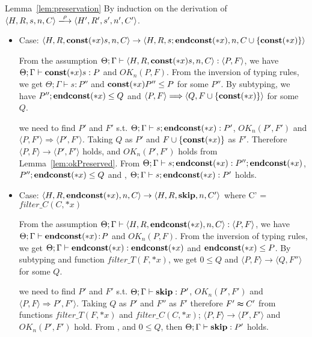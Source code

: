 \begin{pfof}{Lemma~\ref{lem:preservation}}
By induction on the derivation of \(\langle H, R, s, n, C \rangle
\xlongrightarrow{\rho} \langle H' ,R' ,s', n', C' \rangle\).

\begin{itemize}

\item Case: \( \langle H, R, \mathbf{const}(*x) s, n, C \rangle
  \rightarrow \langle H, R, s;\mathbf{endconst}(*x), n, C\cup
  \{\mathbf{const}(*x)\} \rangle \)

  From the assumption \( \Theta; \Gamma \vdash \langle H, R,
  \mathbf{const}(*x) s, n, C \rangle : \langle P, F \rangle\), we have \(
  \Theta; \Gamma \vdash \mathbf{const}(*x) s: P \) and \( OK_n(P, F) \). From
  the inversion of typing rules, we get \( \Theta; \Gamma \vdash s:P''
  \) and \( \mathbf{const}(*x) P'' \le P \) for some \( P'' \). By subtyping,
  we have \( P'';\mathbf{endconst}(*x) \le Q \) and \( \langle P, F \rangle
  \Longrightarrow \langle Q, F\cup \{\mathbf{const}(*x)\} \rangle \) for some
  \( Q \).

  we need to find \(P'\) and \(F'\) s.t. \( \Theta; \Gamma \vdash
  s;\mathbf{endconst}(*x):P'\), \( OK_n(P', F')\) and \( \langle P, F' \rangle
  \Longrightarrow \langle P', F' \rangle \). Taking \( Q \) as \( P'\)
  and \( F \cup \{\mathbf{const}(*x)\} \) as \(F'\). Therefore \( \langle P, F
  \rangle \rightarrow \langle P', F' \rangle\) holds, and \( OK_n(P',
  F')\) holds from Lemma~\ref{lem:okPreserved}. From \( \Theta; \Gamma
  \vdash s;\mathbf{endconst}(*x):P'';\mathbf{endconst}(*x) \), \( P'';\mathbf{endconst}(*x) \le Q \) and
  , \( \Theta; \Gamma \vdash s;\mathbf{endconst}(*x):P'\) holds.

\item Case: \( \langle H, R, \mathbf{endconst}(*x), n, C \rangle \rightarrow
  \langle H, R, \mathbf{skip}, n, C' \rangle \) where C' = \(filter\_C(C,
  *x)\)

   From the assumption \( \Theta; \Gamma \vdash \langle H, R,
   \mathbf{endconst}(*x), n, C \rangle : \langle P, F \rangle\), we have \(
   \Theta; \Gamma \vdash \mathbf{endconst}(*x) \!:\! P\) and \( OK_n(P, F) \). From
   the inversion of typing rules, we get \( \Theta; \Gamma \vdash
   \mathbf{endconst}(*x):\mathbf{endconst}(*x) \) and \( \mathbf{endconst}(*x) \le P \). By subtyping and
   function \(filter\_T(F, *x)\), we get \( 0 \le Q \) and \( \langle
   P, F \rangle \rightarrow \langle Q, F'' \rangle\) for some \( Q \).

   we need to find \(P'\) and \(F'\) s.t. \( \Theta; \Gamma \vdash
  \mathbf{skip}:P'\), \( OK_n(P', F')\) and \( \langle P, F \rangle
  \Longrightarrow P', F' \rangle \). Taking \( Q \) as \( P'\) and
  \(F''\) as \(F'\) therefore \(F' \thickapprox C'\) from functions
  \(filter\_T(F, *x)\) and \(filter\_C(C, *x)\); \( \langle P, F
  \rangle \rightarrow \langle P', F' \rangle\) and \( OK_n(P', F')\)
  hold. From ,  and \( 0 \le Q\), then \( \Theta;
  \Gamma \vdash \mathbf{skip}:P'\) holds.


\end{itemize}
\end{pfof}
